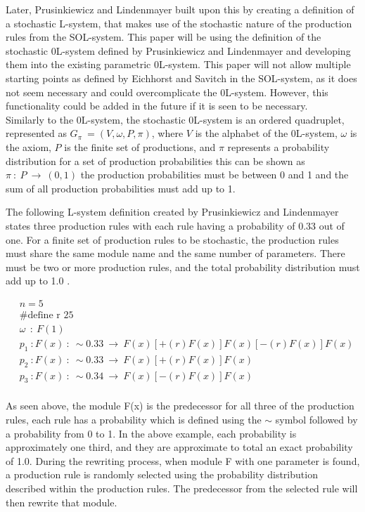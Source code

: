 \newpage
\noindent
Later, Prusinkiewicz and Lindenmayer built upon this by creating a definition of a stochastic L-system, that makes use of the stochastic nature of the production rules from the SOL-system. This paper will be using the definition of the stochastic 0L-system defined by Prusinkiewicz and Lindenmayer and developing them into the existing parametric 0L-system. This paper will not allow multiple starting points as defined by Eichhorst and Savitch in the SOL-system, as it does not seem necessary and could overcomplicate the 0L-system. However, this functionality could be added in the future if it is seen to be necessary. \\
Similarly to the 0L-system, the stochastic 0L-system is an ordered quadruplet, represented as $G_\pi~ = (V, \omega, P, \pi)$, where $V$ is the alphabet of the 0L-system, $\omega$ is the axiom, $P$ is the finite set of productions, and $\pi$ represents a probability distribution for a set of production probabilities this can be shown as $\pi~ :~ P~ \rightarrow~ (0, 1)$ the production probabilities must be between 0 and 1 and the sum of all production probabilities must add up to 1.

The following L-system definition created by Prusinkiewicz and Lindenmayer states three production rules with each rule having a probability of 0.33 out of one. For a finite set of production rules to be stochastic, the production rules must share the same module name and the same number of parameters. There must be two or more production rules, and the total probability distribution must add up to 1.0 \cite{prusinkiewicz2012algorithmic}.

\begin{equation} \label{stochastic example}
\begin{aligned}
	&n=5\\
	&\text{\#define r 25}\\
	&\omega~~ :~ F(1)\\
	&p_1~ :  F(x)~ :~ \sim 0.33 ~ \rightarrow~ F(x)[+(r)F(x)]F(x)[-(r)F(x)]F(x)\\
	&p_2~ :  F(x)~ :~ \sim 0.33 ~ \rightarrow~ F(x)[+(r)F(x)]F(x)\\
	&p_3~ :  F(x)~ :~ \sim 0.34 ~ \rightarrow~ F(x)[-(r)F(x)]F(x)\\
\end{aligned}
\end{equation}

\noindent
As seen above, the module F(x) is the predecessor for all three of the production rules, each rule has a probability which is defined using the $\sim$ symbol followed by a probability from 0 to  1. In the above example, each probability is approximately one third, and they are approximate to total an exact probability of 1.0. During the rewriting process, when module F with one parameter is found, a production rule is randomly selected using the probability distribution described within the production rules. The predecessor from the selected rule will then rewrite that module.

